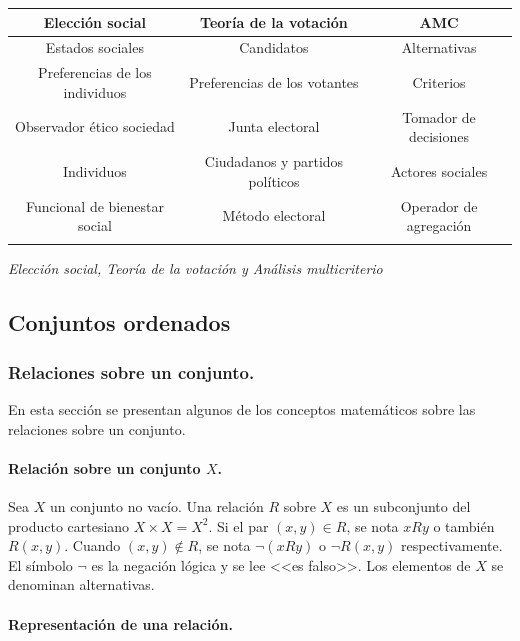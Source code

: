 \documentclass[a5paper,doc,10pt,noapacite]{apa6}
\begin{document}
{{	
	\begin{center}
	\fontsize{7}{11}\selectfont
	\begin{tabular}{c  c c }
		\thickline
		\textbf{Elección social} & \textbf{Teoría de la votación}  & \textbf{AMC} \\	\hline
		 Estados sociales & Candidatos & Alternativas\\
		 Preferencias de los individuos & Preferencias de los votantes & Criterios\\
		 Observador ético \/ sociedad & Junta electoral & Tomador de decisiones \\
		 Individuos & Ciudadanos y partidos políticos & Actores sociales\\
		 Funcional de bienestar social & Método electoral & Operador de agregación\\
		\thickline
		\\[3em]
	\end{tabular}
	\label{tab:B1}

	\emph{Elección social, Teoría de la votación y Análisis multicriterio}
	\end{center}

	\subsection{Conjuntos ordenados}

\subsubsection{Relaciones sobre un conjunto.}
En esta sección se presentan algunos de los conceptos matemáticos sobre las relaciones sobre un conjunto.

\paragraph{Relación sobre un conjunto \(X\).}

Sea \(X\) un conjunto no vacío. Una relación \(R\) sobre  \(X\) es un subconjunto del producto cartesiano \(X \times X = X^2\). Si el par \((x,y) \in R\), se nota \(xRy\) o también \(R(x,y)\). Cuando \((x,y) \not \in R\), se nota \(\neg (xRy)\) o \(\neg R(x,y)\) respectivamente. El
símbolo \(\neg\) es la negación lógica y se lee <<es falso>>. Los elementos de \(X\) se denominan alternativas.

\paragraph{Representación de una relación.}

}}
\end{document}
